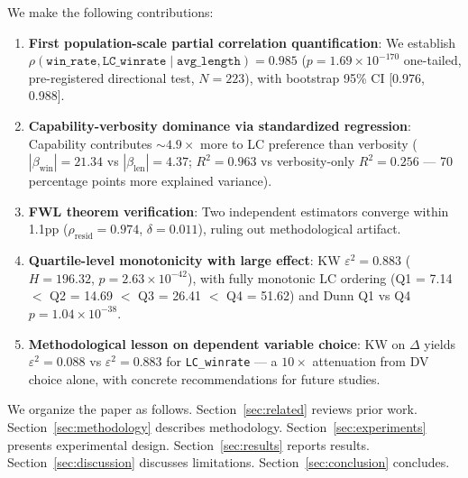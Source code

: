 We make the following contributions:

\begin{enumerate}
  \item \textbf{First population-scale partial correlation quantification}: We establish
    $\rho(\texttt{win\_rate}, \texttt{LC\_winrate} \mid \texttt{avg\_length}) = 0.985$
    ($p = 1.69 \times 10^{-170}$ one-tailed, pre-registered directional test, $N=223$),
    with bootstrap 95\% CI [0.976, 0.988].

  \item \textbf{Capability-verbosity dominance via standardized regression}: Capability
    contributes ${\sim}4.9\times$ more to LC preference than verbosity
    ($|\beta_{\mathrm{win}}| = 21.34$ vs $|\beta_{\mathrm{len}}| = 4.37$;
    $R^2 = 0.963$ vs verbosity-only $R^2 = 0.256$ --- 70 percentage points more explained
    variance).

  \item \textbf{FWL theorem verification}: Two independent estimators converge within 1.1pp
    ($\rho_{\mathrm{resid}} = 0.974$, $\delta = 0.011$), ruling out methodological artifact.

  \item \textbf{Quartile-level monotonicity with large effect}: KW $\varepsilon^2 = 0.883$
    ($H = 196.32$, $p = 2.63 \times 10^{-42}$), with fully monotonic LC ordering
    (Q1 = 7.14 $<$ Q2 = 14.69 $<$ Q3 = 26.41 $<$ Q4 = 51.62) and Dunn Q1 vs Q4
    $p = 1.04 \times 10^{-38}$.

  \item \textbf{Methodological lesson on dependent variable choice}: KW on $\Delta$ yields
    $\varepsilon^2 = 0.088$ vs $\varepsilon^2 = 0.883$ for \texttt{LC\_winrate} --- a
    $10\times$ attenuation from DV choice alone, with concrete recommendations for future
    studies.
\end{enumerate}

We organize the paper as follows. Section~\ref{sec:related} reviews prior work.
Section~\ref{sec:methodology} describes methodology. Section~\ref{sec:experiments} presents
experimental design. Section~\ref{sec:results} reports results. Section~\ref{sec:discussion}
discusses limitations. Section~\ref{sec:conclusion} concludes.
